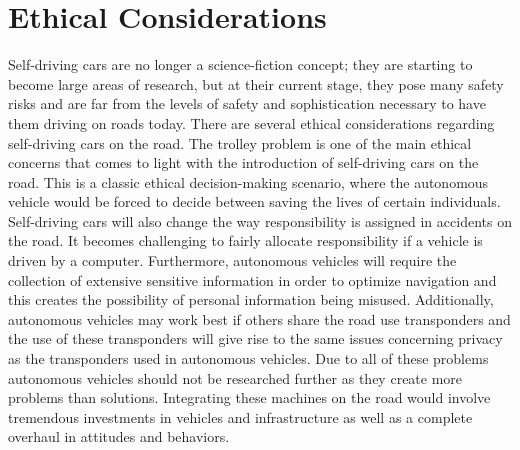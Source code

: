 \documentclass[10pt,twocolumn]{article}
\begin{document}
\section{Ethical Considerations}

Self-driving cars are no longer a science-fiction concept; they are starting to become large areas of research, but at their current stage, they pose many safety risks and are far from the levels of safety and sophistication necessary to have them driving on roads today. There are several ethical considerations regarding self-driving cars on the road. The trolley problem is one of the main ethical concerns that comes to light with the introduction of self-driving cars on the road. This is a classic ethical decision-making scenario, where the autonomous vehicle would be forced to decide between saving the lives of certain individuals. Self-driving cars will also change the way responsibility is assigned in accidents on the road. It becomes challenging to fairly allocate responsibility if a vehicle is driven by a computer. Furthermore, autonomous vehicles will require the collection of extensive sensitive information in order to optimize navigation and this creates the possibility of personal information being misused. Additionally, autonomous vehicles may work best if others share the road use transponders and the use of these transponders will give rise to the same issues concerning privacy as the transponders used in autonomous vehicles. Due to all of these problems autonomous vehicles should not be researched further as they create more problems than solutions. Integrating these machines on the road would involve tremendous investments in vehicles and infrastructure as well as a complete overhaul  in attitudes and behaviors. 
\end{document}
